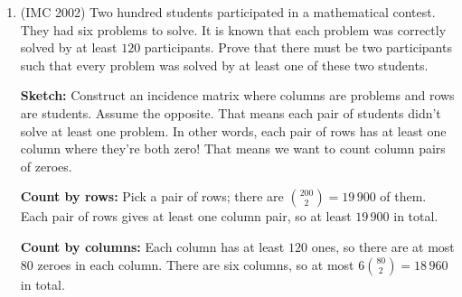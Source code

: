 \documentclass[11pt,paper=letter]{scrartcl}
\newcommand{\cbyrows}{{\bfseries \color{RowBlue} Count by rows: }}
\newcommand{\cbycols}{{\bfseries \color{ColOrange} Count by columns: }}
\begin{document}
\begin{enumerate}
\cbyrows Suppose there are $b$ rows. Each row has $4$ ones, giving $6$ row pairs, and $6b$ pairs in total.

\cbycols Pick a pair of columns; there are $28$ of them. Each pair of columns gives $\lambda$ row pairs. This gives $28\lambda$ pairs in total.

Thus $6b = 28\lambda$, so $\lambda \ge 3$. It remains to find a construction; this is actually the painful part.

\textbf{Sketch 2:} We still count row pairs of ones, but this time, we fix a column and count only the pairs that have a one in this column. In other words, we're counting the pairs of singers who sing in the same song, with one of the singers fixed. Suppose this given singer sang $r$ songs.

\cbyrows Suppose the given singer sang $r$ songs. Each of the $r$ songs gives $3$ row pairs, and $3r$ pairs in total.

\cbycols Each of the other $7$ singers sang $\lambda$ songs with this singer, giving $7\lambda$ pairs in total.

Thus $3r = 7\lambda$ and $\lambda \ge 3$; it remains to find a construction.

\textbf{Remark:} For these problems, the write-ups are easier to understand if we don't mention incidence matrices (or rows, or columns) at all. They're just a tool to help us find what to double count.



\item (IMC 2002) Two hundred students participated in a mathematical contest. They had six problems to solve. It is known that each problem was correctly solved by at least $120$ participants. Prove that there must be two participants such that every problem was solved by at least one of these two students.

\textbf{Sketch:} Construct an incidence matrix where columns are problems and rows are students. Assume the opposite. That means each pair of students didn't solve at least one problem. In other words, each pair of rows has at least one column where they're both zero! That means we want to count column pairs of zeroes.

\cbyrows Pick a pair of rows; there are $\binom{200}{2} = 19\,900$ of them. Each pair of rows gives at least one column pair, so at least $19\,900$ in total.

\cbycols Each column has at least $120$ ones, so there are at most $80$ zeroes in each column. There are six columns, so at most $6\binom{80}{2} = 18\,960$ in total.


\end{enumerate}
\end{document}
